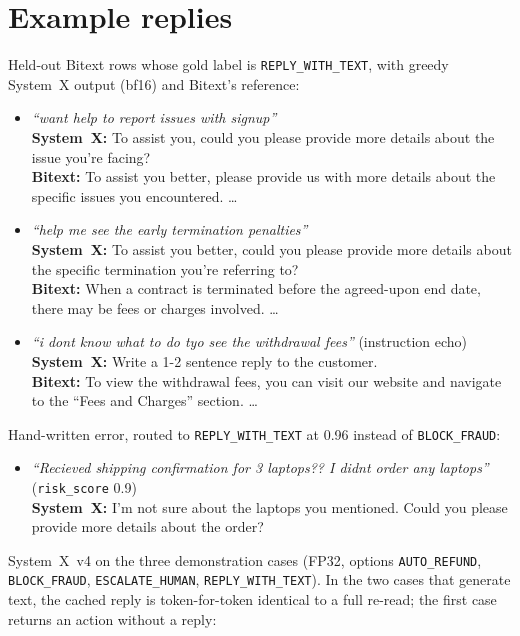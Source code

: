 \documentclass[11pt]{article}
\newcommand{\reply}{\texttt{REPLY\_WITH\_TEXT}}
\newcommand{\sysfour}{System~X~v4}
\begin{document}
\section{Example replies}\label{app:examples}
Held-out Bitext rows whose gold label is \reply{}, with greedy System~X output (bf16) and Bitext's reference:
\begin{small}
\begin{itemize}
\item \emph{``want help to report issues with signup''}\\
\textbf{System~X:} To assist you, could you please provide more details about the issue you're facing?\\
\textbf{Bitext:} To assist you better, please provide us with more details about the specific issues you encountered. \dots
\item \emph{``help me see the early termination penalties''}\\
\textbf{System~X:} To assist you better, could you please provide more details about the specific termination you're referring to?\\
\textbf{Bitext:} When a contract is terminated before the agreed-upon end date, there may be fees or charges involved. \dots
\item \emph{``i dont know what to do tyo see the withdrawal fees''} (instruction echo)\\
\textbf{System~X:} Write a 1-2 sentence reply to the customer.\\
\textbf{Bitext:} To view the withdrawal fees, you can visit our website and navigate to the ``Fees and Charges'' section. \dots
\end{itemize}
\end{small}
Hand-written error, routed to \reply{} at 0.96 instead of \texttt{BLOCK\_FRAUD}:
\begin{small}
\begin{itemize}
\item \emph{``Recieved shipping confirmation for 3 laptops?? I didnt order any laptops''} (\texttt{risk\_score} 0.9)\\
\textbf{System~X:} I'm not sure about the laptops you mentioned. Could you please provide more details about the order?
\end{itemize}
\end{small}
\sysfour{} on the three demonstration cases (FP32, options \texttt{AUTO\_REFUND}, \texttt{BLOCK\_FRAUD}, \texttt{ESCALATE\_HUMAN}, \reply{}). In the two cases that generate text, the cached reply is token-for-token identical to a full re-read; the first case returns an action without a reply:
\end{document}
